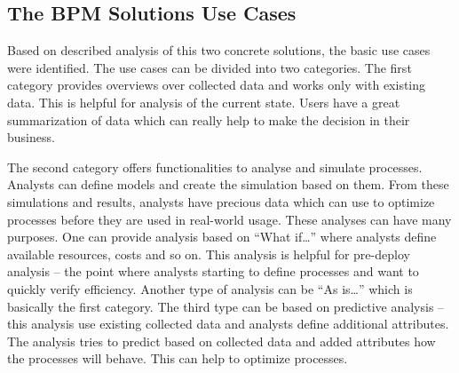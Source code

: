 \subsection{The BPM Solutions Use Cases}
Based on described analysis of this two concrete solutions, the basic use cases were identified. The use cases can be divided into two categories. The first category provides overviews over collected data and works only with existing data. This is helpful for analysis of the current state. Users have a great summarization of data which can really help to make the decision in their business.

The second category offers functionalities to analyse and simulate processes. Analysts can define models and create the simulation based on them. From these simulations and results, analysts have precious data which can use to optimize processes before they are used in real-world usage. These analyses can have many purposes. One can provide analysis based on ``What if\dots'' where analysts define available resources, costs and so on. This analysis is helpful for pre-deploy analysis -- the point where analysts starting to define processes and want to quickly verify efficiency. 
Another type of analysis can be ``As is\dots'' which is basically the first category. The third type can be based on predictive analysis -- this analysis use existing collected data and analysts define additional attributes. The analysis tries to predict based on collected data and added attributes how the processes will behave. This can help to optimize processes. 

